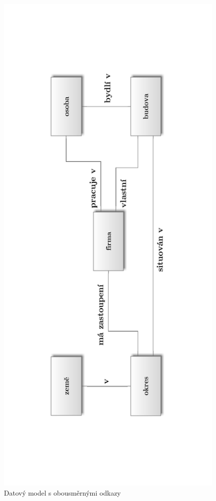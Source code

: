 \begin{figure}
\centering\includegraphics[angle=-90,width=14cm]{graphics/01-sitovy}
\caption{Datový model s obousměrnými odkazy}
\end{figure}

